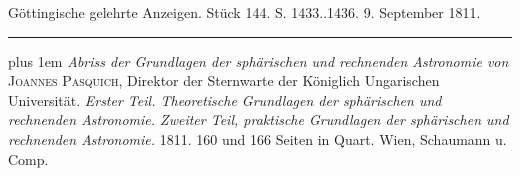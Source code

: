 \begin{center}\small Göttingische gelehrte Anzeigen. Stück 144. S. 1433..1436. 9. September 1811.\\[3pt]\rule{.72\linewidth}{.3pt}\end{center}

{\rightskip=0pt plus 1em \emph{Abriss der Grundlagen der sphärischen und rechnenden Astronomie von} \textsc{Joannes Pasquich}, Direktor der Sternwarte der Königlich Ungarischen Universität. \emph{Erster Teil. {Theoretische} Grundlagen der sphärischen und rechnenden Astronomie. Zweiter Teil, {praktische} Grundlagen der sphärischen und rechnenden Astronomie.} 1811. 160 und 166 Seiten in Quart. Wien, Schaumann u. Comp.\par}


